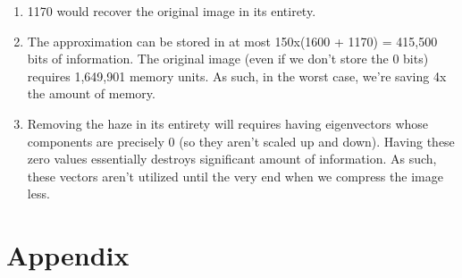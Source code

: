 \documentclass[12pt]{article}
\begin{document}
\begin{enumerate}[label=(\alph*)]
  \item 1170 would recover the original image in its entirety.
  \item The approximation can be stored in at most 150x(1600 + 1170) = 415,500 bits of information. The original image (even if we don't store the 0 bits) requires 1,649,901 memory units. As such, in the worst case, we're saving 4x the amount of memory.
  \item Removing the haze in its entirety will requires having eigenvectors whose components are precisely 0 (so they aren't scaled up and down). Having these zero values essentially destroys significant amount of information. As such, these vectors aren't utilized until the very end when we compress the image less.
\end{enumerate}

\newpage
\section*{Appendix}

\end{document}
